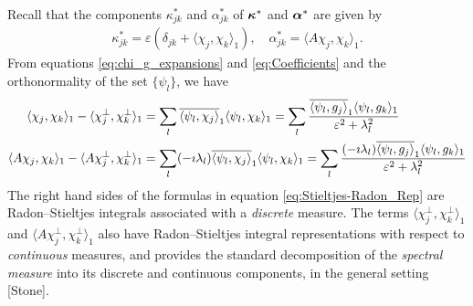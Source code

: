 \documentclass{article}
\newcommand\bkappa{\mbox{\boldmath${\kappa}$}}
\newcommand\balpha{\mbox{\boldmath${\alpha}$}}
\newcommand{\0}{\mathbf{0}}
\newcommand{\1}{\mathbf{1}}
\newcommand{\2}{\mathbf{2}}
\newcommand{\3}{\mathbf{3}}
\newcommand{\4}{\mathbf{4}}
\newcommand{\5}{\mathbf{5}}
\newcommand{\6}{\mathbf{6}}
\newcommand{\7}{\mathbf{7}}
\newcommand{\8}{\mathbf{8}}
\begin{document}
Recall that the components $\kappa^*_{jk}$ and $\alpha^*_{jk}$ of $\bkappa^*$
and $\balpha^*$ are given by 
%
\begin{align}\label{eq:Effective_Diffusivity}
  \kappa^*_{jk}=\varepsilon(\delta_{jk}+\langle\chi_j,\chi_k\rangle_1), \quad
  \alpha^*_{jk}=\langle A\chi_j,\chi_k\rangle_1.
\end{align}
%
From equations \eqref{eq:chi_g_expansions} and \eqref{eq:Coefficients}
and the orthonormality of the set $\{\psi_l\}$, we have
%
\begin{align}\label{eq:Stieltjes-Radon_Rep}
  \langle\chi_j,\chi_k\rangle_1-\langle\chi_j^\perp,\chi_k^\perp\rangle_1&=\sum_l\overline{\langle\psi_l,\chi_j\rangle}_1\langle\psi_l,\chi_k\rangle_1
         =\sum_l\frac{\overline{\langle\psi_l,g_j\rangle}_1\langle\psi_l,g_k\rangle_1}{\varepsilon^2+\lambda_l^2}
         \notag\\
  \langle A\chi_j,\chi_k\rangle_1-\langle A\chi_j^\perp,\chi_k^\perp\rangle_1&=\sum_l(-\imath\lambda_l)\overline{\langle\psi_l,\chi_j\rangle}_1\langle\psi_l,\chi_k\rangle_1
         =\sum_l\frac{(-\imath\lambda_l)\overline{\langle\psi_l,g_j\rangle}_1\langle\psi_l,g_k\rangle_1}{\varepsilon^2+\lambda_l^2}      
\end{align}
%
The right hand sides of the formulas in equation
\eqref{eq:Stieltjes-Radon_Rep} are Radon--Stieltjes integrals
associated with a \emph{discrete} measure. The terms $\langle\chi_j^\perp,\chi_k^\perp\rangle_1$ and
$\langle A\chi_j^\perp,\chi_k^\perp\rangle_1$ also have Radon--Stieltjes integral representations
with respect to \emph{continuous} measures, and provides the standard
decomposition of the \emph{spectral measure} into its discrete and
continuous components, in the general setting [Stone].
\end{document}
